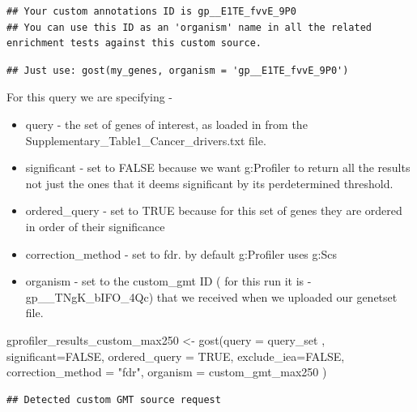 \documentclass[
]{book}
\newenvironment{Shaded}{\begin{snugshade}}{\end{snugshade}}
\newcommand{\AttributeTok}[1]{\textcolor[rgb]{0.77,0.63,0.00}{#1}}
\newcommand{\ConstantTok}[1]{\textcolor[rgb]{0.00,0.00,0.00}{#1}}
\newcommand{\FunctionTok}[1]{\textcolor[rgb]{0.00,0.00,0.00}{#1}}
\newcommand{\NormalTok}[1]{#1}
\newcommand{\OtherTok}[1]{\textcolor[rgb]{0.56,0.35,0.01}{#1}}
\newcommand{\StringTok}[1]{\textcolor[rgb]{0.31,0.60,0.02}{#1}}
\providecommand{\tightlist}{%
  \setlength{\itemsep}{0pt}\setlength{\parskip}{0pt}}
\begin{document}
\begin{verbatim}
## Your custom annotations ID is gp__E1TE_fvvE_9P0
## You can use this ID as an 'organism' name in all the related enrichment tests against this custom source.
\end{verbatim}

\begin{verbatim}
## Just use: gost(my_genes, organism = 'gp__E1TE_fvvE_9P0')
\end{verbatim}

For this query we are specifying -

\begin{itemize}
\tightlist
\item
  query - the set of genes of interest, as loaded in from the Supplementary\_Table1\_Cancer\_drivers.txt file.
\item
  significant - set to FALSE because we want g:Profiler to return all the results not just the ones that it deems significant by its perdetermined threshold.
\item
  ordered\_query - set to TRUE because for this set of genes they are ordered in order of their significance
\item
  correction\_method - set to fdr. by default g:Profiler uses g:Scs
\item
  organism - set to the custom\_gmt ID ( for this run it is - gp\_\_TNgK\_bIFO\_4Qc) that we received when we uploaded our genetset file.
\end{itemize}

\begin{Shaded}
\begin{Highlighting}[]
\NormalTok{gprofiler\_results\_custom\_max250 }\OtherTok{\textless{}{-}} \FunctionTok{gost}\NormalTok{(}\AttributeTok{query =}\NormalTok{ query\_set ,}
                                     \AttributeTok{significant=}\ConstantTok{FALSE}\NormalTok{,}
                                 \AttributeTok{ordered\_query =} \ConstantTok{TRUE}\NormalTok{,}
                                    \AttributeTok{exclude\_iea=}\ConstantTok{FALSE}\NormalTok{,}
                                     \AttributeTok{correction\_method =} \StringTok{"fdr"}\NormalTok{,}
                                 \AttributeTok{organism =}\NormalTok{ custom\_gmt\_max250}
\NormalTok{                                     )}
\end{Highlighting}
\end{Shaded}

\begin{verbatim}
## Detected custom GMT source request
\end{verbatim}
\end{document}

